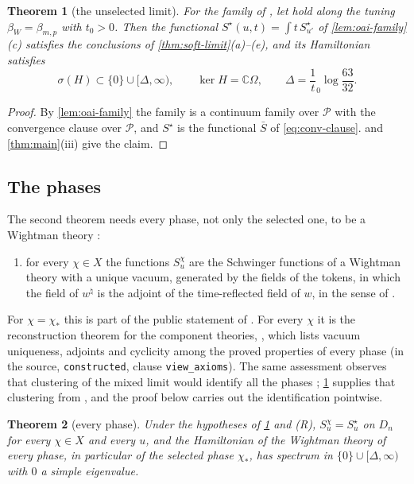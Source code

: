 \documentclass[11pt,a4paper]{amsart}
\newtheorem{theorem}{Theorem}[section]
\theoremstyle{definition}
\theoremstyle{remark}
\numberwithin{equation}{section}
\newcommand{\C}{\mathbb{C}}          %
\newcommand{\Mcirc}{\text{\upshape(M$^{\circ}$)}}   %
\newcommand{\tzero}{t_0}                   %
\newcommand{\betaW}{\beta_{W}}             %
\begin{document}
\begin{theorem}[the unselected limit]\label{thm:constructed-gap}
For the family of \cite{openaiym}, let \Mcirc{} hold along the tuning $\betaW=\beta_{m,p}$ with $\tzero>0$. Then the functional $S^\star(u,t)=\int t\,S^\star_{u'}$ of \cref{lem:oai-family}(c) satisfies the conclusions of \cref{thm:soft-limit}(a)--(e), and its Hamiltonian satisfies
\[
\sigma(H)\subset\{0\}\cup[\Delta,\infty),\qquad\ker H=\C\Omega,\qquad\Delta=\frac1\tzero\log\frac{63}{32} .
\]
\end{theorem}

\begin{proof}
By \cref{lem:oai-family} the family is a continuum family over $\mathcal P$ with the convergence clause over $\mathcal P$, and $S^\star$ is the functional $\bar S$ of \eqref{eq:conv-clause}.  and \cref{thm:main}(iii) give the claim.
\end{proof}

\subsection{The phases}
The second theorem needs every phase, not only the selected one, to be a Wightman theory \cite{wightman1956,streater2000}:
\begin{enumerate}[label=(R),leftmargin=3em]
\item for every $\chi\in X$ the functions $S^\chi_u$ are the Schwinger functions of a Wightman theory with a unique vacuum, generated by the fields of the tokens, in which the field of $w^\natural$ is the adjoint of the time-reflected field of $w$, in the sense of \cite[Section~7.5 and Lemma~13]{bhattacharjee2026first}.
\end{enumerate}
For $\chi=\chi_*$ this is part of the public statement of \cite{openaiym}. For every $\chi$ it is the reconstruction theorem for the component theories, \cite[Theorem~6.1]{ymgroup2026}, which lists vacuum uniqueness, adjoints and cyclicity among the proved properties of every phase (in the source, \texttt{constructed}, clause \texttt{view\_axioms}). The same assessment observes that clustering of the mixed limit would identify all the phases \cite[Section~6.2]{ymgroup2026}; \cref{thm:constructed-gap} supplies that clustering from \Mcirc, and the proof below carries out the identification pointwise.

\begin{theorem}[every phase]\label{thm:constructed-phases}
Under the hypotheses of \cref{thm:constructed-gap} and (R), $S^\chi_u=S^\star_u$ on $D_n$ for every $\chi\in X$ and every $u$, and the Hamiltonian of the Wightman theory of every phase, in particular of the selected phase $\chi_*$, has spectrum in $\{0\}\cup[\Delta,\infty)$ with $0$ a simple eigenvalue.
\end{theorem}
\end{document}
